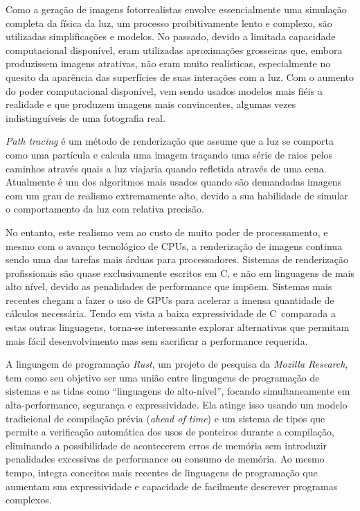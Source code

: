 \documentclass[12pt]{article}
\def\Cpp{{C\nolinebreak[4]\raisebox{.20ex}{\small\bf++}}}
\begin{document}
Como a geração de imagens fotorrealistas envolve essencialmente uma simulação completa da física da
luz, um processo proibitivamente lento e complexo, são utilizadas simplificações e modelos. No
passado, devido a limitada capacidade computacional disponível, eram utilizadas aproximações
grosseiras que, embora produzissem imagens atrativas, não eram muito realísticas, especialmente no
quesito da aparência das superfícies de suas interações com a luz. Com o aumento do poder
computacional disponível, vem sendo usados modelos mais fiéis a realidade e que produzem imagens
mais convincentes, algumas vezes indistinguíveis de uma fotografia real.

\emph{Path tracing} é um método de renderização que assume que a luz se comporta como uma partícula
e calcula uma imagem traçando uma série de raios pelos caminhos através quais a luz viajaria quando
refletida através de uma cena. Atualmente é um dos algoritmos mais usados quando são demandadas
imagens com um grau de realismo extremamente alto, devido a sua habilidade de simular o
comportamento da luz com relativa precisão.

No entanto, este realismo vem ao custo de muito poder de processamento, e mesmo com o avanço
tecnológico de CPUs, a renderização de imagens continua sendo uma das tarefas mais árduas para
processadores. Sistemas de renderização profissionais são quase exclusivamente escritos em \Cpp, e
não em linguagens de mais alto nível, devido as penalidades de performance que impõem. Sistemas mais
recentes chegam a fazer o uso de GPUs para acelerar a imensa quantidade de cálculos necessária.
Tendo em vista a baixa expressividade de \Cpp\ comparada a estas outras linguagens, torna-se
interessante explorar alternativas que permitam mais fácil desenvolvimento mas sem sacrificar a
performance requerida.

A linguagem de programação \emph{Rust}, um projeto de pesquisa da \emph{Mozilla Research}, tem como
seu objetivo ser uma união entre linguagens de programação de sistemas e as tidas como ``linguagens
de alto-nível'', focando simultaneamente em alta-performance, segurança e expressividade. Ela atinge
isso usando um modelo tradicional de compilação prévia (\emph{ahead of time}) e um sistema de tipos
que permite a verificação automática dos usos de ponteiros durante a compilação, eliminando a
possibilidade de acontecerem erros de memória sem introduzir penalidades excessivas de performance
ou consumo de memória. Ao mesmo tempo, integra conceitos mais recentes de linguagens de programação
que aumentam sua expressividade e capacidade de facilmente descrever programas complexos.
\end{document}
